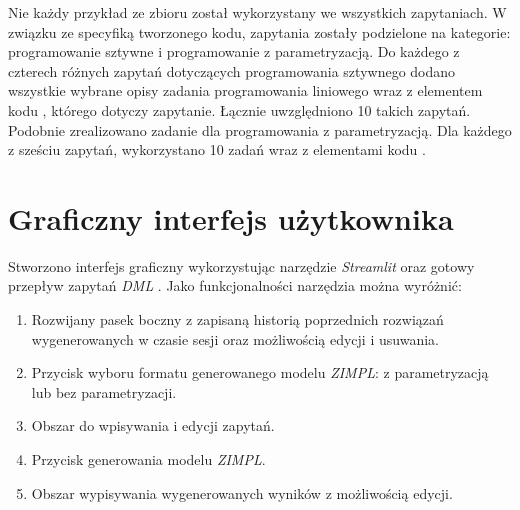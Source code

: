 Nie każdy przykład ze zbioru został wykorzystany we wszystkich zapytaniach. W związku ze specyfiką tworzonego kodu, zapytania zostały podzielone na kategorie: programowanie sztywne i programowanie z parametryzacją. Do każdego z czterech różnych zapytań dotyczących programowania sztywnego %
dodano wszystkie wybrane opisy zadania programowania liniowego
wraz z elementem kodu  , którego dotyczy zapytanie. Łącznie uwzględniono 10 takich zapytań. Podobnie zrealizowano zadanie dla programowania z parametryzacją. Dla każdego z sześciu zapytań, wykorzystano 10 zadań wraz z elementami kodu  . %


\section{Graficzny interfejs użytkownika}\label{sec:generation:gui}

Stworzono interfejs graficzny wykorzystując narzędzie \textit{Streamlit} \cite{TODO} oraz gotowy przepływ zapytań \textit{DML} \cite{TODO}. Jako funkcjonalności narzędzia można wyróżnić:

\begin{enumerate}
\item Rozwijany pasek boczny z zapisaną historią poprzednich rozwiązań wygenerowanych w czasie sesji oraz możliwością edycji i usuwania.
\item Przycisk wyboru formatu generowanego modelu \textit{ZIMPL}: z parametryzacją lub bez parametryzacji.
\item Obszar do wpisywania i edycji zapytań.
\item Przycisk generowania modelu \textit{ZIMPL}.
\item Obszar wypisywania wygenerowanych wyników z możliwością edycji.
\end{enumerate}

